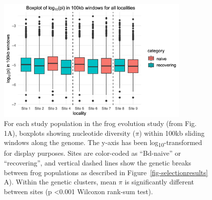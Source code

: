 \documentclass[9pt,twoside,lineno]{pnas-new}
\begin{document}
\newpage

\begin{figure}

{\centering \includegraphics[width=0.85\textwidth]{figures/boxplot_pi_by_site.png}

}

\caption{\label{fig-boxplot-pi}For each study population in the frog
evolution study (from Fig. 1A), boxplots
showing nucleotide diversity (\(\pi\)) within 100kb sliding windows
along the genome. The y-axis has been log\textsubscript{10}-transformed
for display purposes. Sites are color-coded as ``Bd-naive'' or
``recovering'', and vertical dashed lines show the genetic breaks
between frog populations as described in
Figure~\ref{fig-selectionresults} A). Within the genetic clusters,
mean \(\pi\) is significantly different between sites (p \textless0.001
Wilcoxon rank-sum test).}

\end{figure}\clearpage

\newpage
\end{document}
